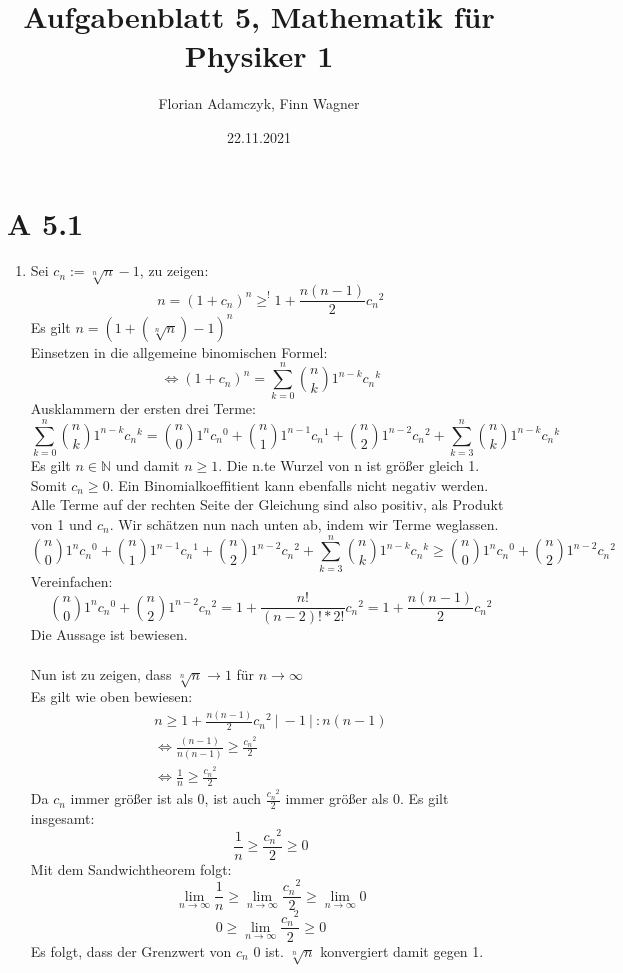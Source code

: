 \documentclass{article}
\date{22.11.2021}
\title{Aufgabenblatt 5, Mathematik für Physiker 1}
\author{Florian Adamczyk, Finn Wagner}
\begin{document}
    \maketitle

    \section*{A 5.1}
    \begin{enumerate}[ label = (\alph*)]
        \item Sei \(c_n := \sqrt[n]{n} - 1\), zu zeigen:
        \[ n = {(1+c_n)}^n \geq^! 1 + \frac{n (n-1)}{2} {c_n}^2 \]
        Es gilt \( n = {(1 + (\sqrt[n]{n}) -1)}^n \) \\
        Einsetzen in die allgemeine binomischen Formel:
        \[ \Leftrightarrow {(1+c_n)}^n = \sum_{k=0}^{n} \binom{n}{k} 1^{n-k} {c_n}^k \]
        Ausklammern der ersten drei Terme:
        \[ \sum_{k=0}^{n} \binom{n}{k} 1^{n-k} {c_n}^k = \binom{n}{0} 1^n {c_n}^0 + \binom{n}{1} 1^{n-1} {c_n}^1 + \binom{n}{2} 1^{n-2} {c_n}^2 + \sum_{k=3}^{n} \binom{n}{k} 1^{n-k} {c_n}^k \]
        Es gilt \(n \in \mathbb{N}\) und damit \(n \geq 1\). Die n.te Wurzel von n ist größer gleich 1. Somit \(c_n \geq 0\).
        Ein Binomialkoeffitient kann ebenfalls nicht negativ werden. Alle Terme auf der rechten Seite der Gleichung sind also positiv, als Produkt von 1 und \(c_n\).
        Wir schätzen nun nach unten ab, indem wir Terme weglassen.
        \[ \binom{n}{0} 1^n {c_n}^0 + \binom{n}{1} 1^{n-1} {c_n}^1 + \binom{n}{2} 1^{n-2} {c_n}^2 + \sum_{k=3}^{n} \binom{n}{k} 1^{n-k} {c_n}^k \geq \binom{n}{0} 1^n {c_n}^0 + \binom{n}{2} 1^{n-2} {c_n}^2 \]
        Vereinfachen:
        \[ \binom{n}{0} 1^n {c_n}^0 + \binom{n}{2} 1^{n-2} {c_n}^2 = 1 + \frac{n!}{(n-2)! * 2!} {c_n}^2 = 1 + \frac{n (n-1)}{2} {c_n}^2 \]
        Die Aussage ist bewiesen. \\ \\
        Nun ist zu zeigen, dass \(\sqrt[n]{n} \to 1\) für \(n \to \infty \) \\
        Es gilt wie oben bewiesen: 
        \begin{gather*}
            n \geq 1 + \frac{n (n-1)}{2} {c_n}^2 \ | \ -1 \ | \ : n(n-1) \\
            \Leftrightarrow \frac{(n-1)}{n(n-1)} \geq \frac{{c_n}^2}{2} \\
            \Leftrightarrow \frac{1}{n} \geq \frac{{c_n}^2}{2}
        \end{gather*}
        Da \(c_n\) immer größer ist als 0, ist auch \(\frac{{c_n}^2}{2}\) immer größer als 0. Es gilt insgesamt:
        \[ \frac{1}{n} \geq \frac{{c_n}^2}{2} \geq 0 \]
        Mit dem Sandwichtheorem folgt:
        \[ \lim_{n \to \infty} \frac{1}{n} \geq \lim_{n \to \infty} \frac{{c_n}^2}{2} \geq \lim_{n \to \infty} 0 \]
        \[ 0 \geq \lim_{n \to \infty} \frac{{c_n}^2}{2} \geq 0 \]
        Es folgt, dass der Grenzwert von \(c_n\) 0 ist. \(\sqrt[n]{n}\) konvergiert damit gegen 1.


\end{enumerate}
\end{document}
